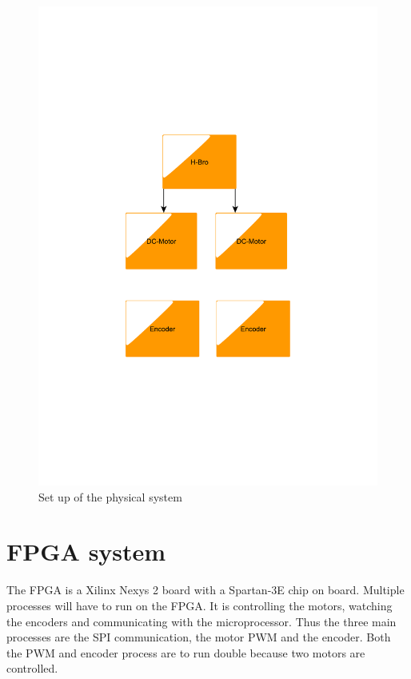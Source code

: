 \begin{figure}[htb]
	\centering
	\includegraphics[scale=0.4,trim=200 200 200 200]{graphics/phsycicalsystem} %
	\caption{Set up of the physical system}
	\label{fig:phsysicalsystem}			%
\end{figure}

\section{FPGA system}\label{sec:FPGA}

The FPGA is a Xilinx Nexys 2 board with a Spartan-3E chip on board. Multiple processes will have to run on the FPGA. It is controlling the motors, watching the encoders and communicating with the microprocessor. Thus the three main processes are the SPI communication, the motor PWM and the encoder. Both the PWM and encoder process are to run double because two motors are controlled. 


